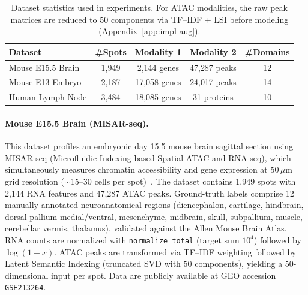 \documentclass{article}
\theoremstyle{plain}
\theoremstyle{definition}
\begin{document}
\begin{table}[!ht]
\centering
\caption{Dataset statistics used in experiments. For ATAC modalities, the raw peak matrices are reduced to $50$ components via TF--IDF + LSI before modeling (Appendix~\ref{app:impl-aug}).}
\label{tab:dataset-stats}
\small
\begin{tabular}{lcccc}
\toprule
Dataset & \#Spots & Modality 1 & Modality 2 & \#Domains \\
\midrule
Mouse E15.5 Brain & 1{,}949 & 2{,}144 genes & 47{,}287 peaks & 12 \\
Mouse E13 Embryo & 2{,}187 & 17{,}058 genes & 24{,}017 peaks & 14 \\
Human Lymph Node & 3{,}484 & 18{,}085 genes & 31 proteins & 10 \\
\bottomrule
\end{tabular}
\end{table}

\paragraph{Mouse E15.5 Brain (MISAR-seq).}
This dataset profiles an embryonic day 15.5 mouse brain sagittal section using MISAR-seq (Microfluidic Indexing-based Spatial ATAC and RNA-seq), which simultaneously measures chromatin accessibility and gene expression at 50\,$\mu$m grid resolution ($\sim$15--30 cells per spot)~\cite{zuo2023misar}. The dataset contains 1{,}949 spots with 2{,}144 RNA features and 47{,}287 ATAC peaks. Ground-truth labels comprise 12 manually annotated neuroanatomical regions (diencephalon, cartilage, hindbrain, dorsal pallium medial/ventral, mesenchyme, midbrain, skull, subpallium, muscle, cerebellar vermis, thalamus), validated against the Allen Mouse Brain Atlas. RNA counts are normalized with \texttt{normalize\_total} (target sum $10^4$) followed by $\log(1+x)$. ATAC peaks are transformed via TF--IDF weighting followed by Latent Semantic Indexing (truncated SVD with $50$ components), yielding a 50-dimensional input per spot. Data are publicly available at GEO accession \texttt{GSE213264}.
\end{document}
